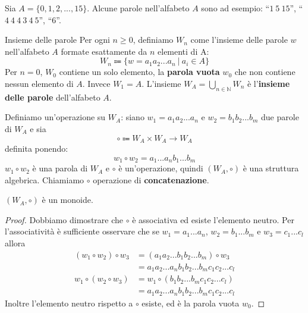 \begin{example}
	Sia $A = \{0,1,2,...,15\}$. Alcune parole nell'alfabeto $A$ sono ad esempio: ``$1 \ 5 \ 15$'', ``$4 \ 4 \ 4 \ 3 \ 4 \ 5$'', ``$6$''.
\end{example}

\begin{defbox}{Insieme delle parole}
	Per ogni $n \geq 0$, definiamo $W_{n}$ come l'insieme delle parole $w$ nell'alfabeto $A$ formate esattamente da $n$ elementi di A:
	\begin{equation}
		W_{n} \Coloneqq \{ w=a_{1}a_{2}...a_{n} \ | \ a_{i}\in A\}
	\end{equation}
	Per $n=0$, $W_{0}$ contiene un solo elemento, la \textbf{parola vuota} $w_{0}$ che non contiene nessun elemento di $A$. Invece $W_{1}=A$. L'insieme $W_{A}=\bigcup_{n \in \mathbb{N}}W_{n}$ è l'\textbf{insieme delle parole} dell'alfabeto $A$.
	
	Definiamo un'operazione su $W_{A}$: siano $w_{1}=a_{1}a_{2}...a_{n}$ e $w_{2}=b_{1}b_{2}...b_{m}$ due parole di $W_{A}$ e sia $$\circ \Coloneqq W_{A} \times W_{A} \longrightarrow W_{A}$$ definita ponendo:
	\begin{equation}
		w_{1} \circ w_{2} =a_{1}...a_{n}b_{1}...b_{m}
	\end{equation}
	$w_{1}\circ w_{2}$ è una parola di $W_{A}$ e $\circ$ è un'operazione, quindi $(W_{A},\circ)$ è una struttura algebrica. Chiamiamo $\circ$ operazione di \textbf{concatenazione}.
\end{defbox}

\begin{propbox}	
	$(W_{A},\circ)$ è un monoide.
\end{propbox}


\begin{proof}
	Dobbiamo dimostrare che $\circ$ è associativa ed esiste l'elemento neutro. Per l'associatività è sufficiente osservare che se $w_{1}=a_{1}...a_{n}$, $w_{2}=b_{1}...b_{m}$ e $w_{3}=c_{1}...c_{l}$ allora
	\begin{align*}
		(w_{1}\circ w_{2}) \circ w_{3} &= (a_{1} a_{2}...b_{1} b_{2}...b_{m})\circ w_{3}\\
		&= a_{1}a_{2}...a_{n}b_{1}b_{2}...b_{m}c_{1}c_{2}...c_{l}\\
		w_{1} \circ (w_{2} \circ w_{3}) &= w_{1} \circ (b_{1}b_{2}...b_{m}c_{1}c_{2}...c_{l})\\
		&= a_{1}a_{2}...a_{n}b_{1}b_{2}...b_{m}c_{1}c_{2}...c_{l}
	\end{align*}
	Inoltre l'elemento neutro rispetto a $\circ$ esiste, ed è la parola vuota $w_{0}$.
\end{proof}



